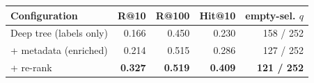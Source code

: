 \begin{tabular}{lrrrr}
\toprule
Configuration & R@10 & R@100 & Hit@10 & empty-sel. $q$ \\
\midrule
Deep tree (labels only) & 0.166 & 0.450 & 0.230 & 158 / 252 \\
+ metadata (enriched) & 0.214 & 0.515 & 0.286 & 127 / 252 \\
+ re-rank & \textbf{0.327} & \textbf{0.519} & \textbf{0.409} & \textbf{121 / 252} \\
\bottomrule
\end{tabular}
